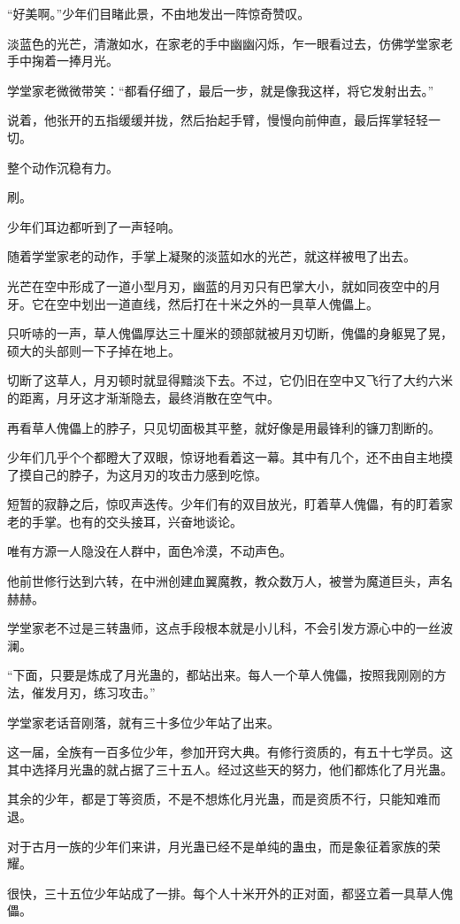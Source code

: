 \begin{this_body}
“好美啊。”少年们目睹此景，不由地发出一阵惊奇赞叹。

淡蓝色的光芒，清澈如水，在家老的手中幽幽闪烁，乍一眼看过去，仿佛学堂家老手中掬着一捧月光。

学堂家老微微带笑：“都看仔细了，最后一步，就是像我这样，将它发射出去。”

说着，他张开的五指缓缓并拢，然后抬起手臂，慢慢向前伸直，最后挥掌轻轻一切。

整个动作沉稳有力。

刷。

少年们耳边都听到了一声轻响。

随着学堂家老的动作，手掌上凝聚的淡蓝如水的光芒，就这样被甩了出去。

光芒在空中形成了一道小型月刃，幽蓝的月刃只有巴掌大小，就如同夜空中的月牙。它在空中划出一道直线，然后打在十米之外的一具草人傀儡上。

只听哧的一声，草人傀儡厚达三十厘米的颈部就被月刃切断，傀儡的身躯晃了晃，硕大的头部则一下子掉在地上。

切断了这草人，月刃顿时就显得黯淡下去。不过，它仍旧在空中又飞行了大约六米的距离，月牙这才渐渐隐去，最终消散在空气中。

再看草人傀儡上的脖子，只见切面极其平整，就好像是用最锋利的镰刀割断的。

少年们几乎个个都瞪大了双眼，惊讶地看着这一幕。其中有几个，还不由自主地摸了摸自己的脖子，为这月刃的攻击力感到吃惊。

短暂的寂静之后，惊叹声迭传。少年们有的双目放光，盯着草人傀儡，有的盯着家老的手掌。也有的交头接耳，兴奋地谈论。

唯有方源一人隐没在人群中，面色冷漠，不动声色。

他前世修行达到六转，在中洲创建血翼魔教，教众数万人，被誉为魔道巨头，声名赫赫。

学堂家老不过是三转蛊师，这点手段根本就是小儿科，不会引发方源心中的一丝波澜。

“下面，只要是炼成了月光蛊的，都站出来。每人一个草人傀儡，按照我刚刚的方法，催发月刃，练习攻击。”

学堂家老话音刚落，就有三十多位少年站了出来。

这一届，全族有一百多位少年，参加开窍大典。有修行资质的，有五十七学员。这其中选择月光蛊的就占据了三十五人。经过这些天的努力，他们都炼化了月光蛊。

其余的少年，都是丁等资质，不是不想炼化月光蛊，而是资质不行，只能知难而退。

对于古月一族的少年们来讲，月光蛊已经不是单纯的蛊虫，而是象征着家族的荣耀。

很快，三十五位少年站成了一排。每个人十米开外的正对面，都竖立着一具草人傀儡。


\end{this_body}
